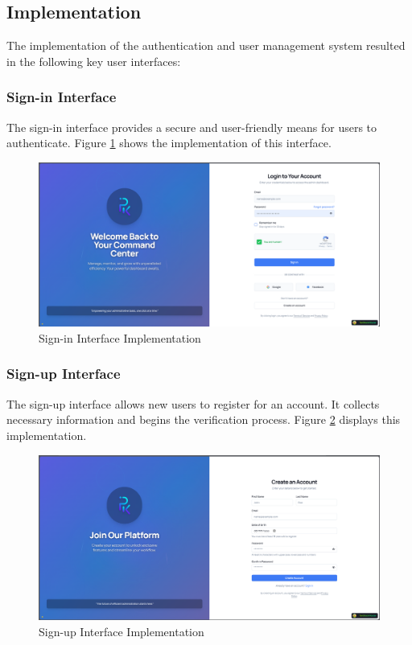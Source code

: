 \subsection{Implementation}
The implementation of the authentication and user management system resulted in the following key user interfaces:

\subsubsection{Sign-in Interface}
The sign-in interface provides a secure and user-friendly means for users to authenticate. Figure \ref{fig:signin-interface} shows the implementation of this interface.
\newpage
\begin{figure}[htbp]
    \centering
    \includegraphics[width=1\textwidth]{images/signin-interface.png}
    \caption{Sign-in Interface Implementation}
    \label{fig:signin-interface}
\end{figure}

\subsubsection{Sign-up Interface}
The sign-up interface allows new users to register for an account. It collects necessary information and begins the verification process. Figure \ref{fig:signup-interface} displays this implementation.

\begin{figure}[htbp]
    \centering
    \includegraphics[width=1\textwidth]{images/signup-interface.png}
    \caption{Sign-up Interface Implementation}
    \label{fig:signup-interface}
\end{figure}

